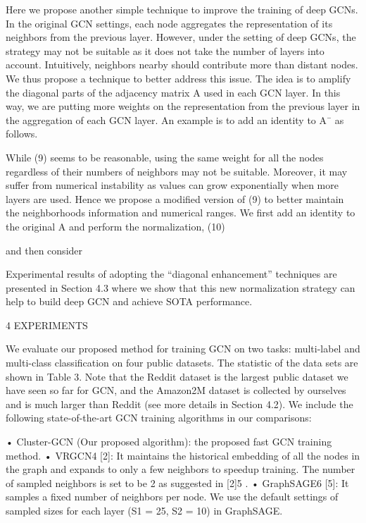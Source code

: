 \documentclass[
]{book}
\begin{document}
{{{Here we propose another simple technique to improve the training of deep GCNs. In the original GCN settings, each node aggregates the representation of its neighbors from the previous layer. However, under the setting of deep GCNs, the strategy may not be suitable as it does not take the number of layers into account. Intuitively, neighbors nearby should contribute more than distant nodes. We thus propose a technique to better address this issue. The idea is to amplify the diagonal parts of the adjacency matrix A used in each GCN layer. In this way, we are putting more weights on the representation from the previous layer in the aggregation of each GCN layer. An example is to add an identity to A¯ as follows.

While (9) seems to be reasonable, using the same weight for all the nodes regardless of their numbers of neighbors may not be suitable. Moreover, it may suffer from numerical instability as values can grow exponentially when more layers are used. Hence we propose a modified version of (9) to better maintain the neighborhoods information and numerical ranges. We first add an identity to the original A and perform the normalization, (10)

and then consider

Experimental results of adopting the ``diagonal enhancement'' techniques are presented in Section 4.3 where we show that this new normalization strategy can help to build deep GCN and achieve SOTA performance.

4 EXPERIMENTS

We evaluate our proposed method for training GCN on two tasks: multi-label and multi-class classification on four public datasets. The statistic of the data sets are shown in Table 3. Note that the Reddit dataset is the largest public dataset we have seen so far for GCN, and the Amazon2M dataset is collected by ourselves and is much larger than Reddit (see more details in Section 4.2). We include the following state-of-the-art GCN training algorithms in our comparisons:

• Cluster-GCN (Our proposed algorithm): the proposed fast GCN training method.
• VRGCN4 {[}2{]}: It maintains the historical embedding of all the nodes in the graph and expands to only a few neighbors to speedup training. The number of sampled neighbors is set to be 2 as suggested in {[}2{]}5 .
• GraphSAGE6 {[}5{]}: It samples a fixed number of neighbors per node. We use the default settings of sampled sizes for each layer (S1 = 25, S2 = 10) in GraphSAGE.

}}}
\end{document}
